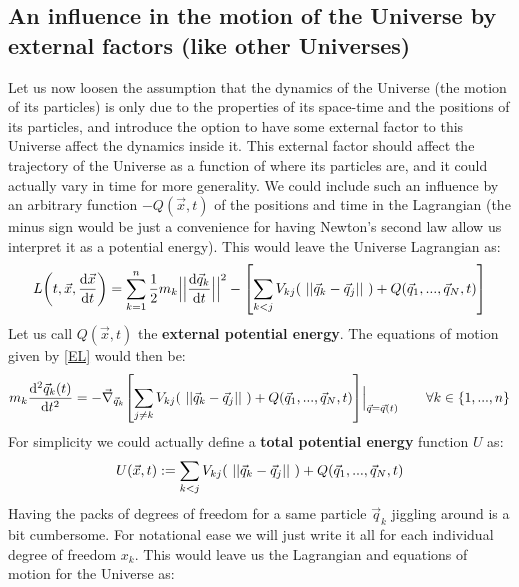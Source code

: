 \documentclass[11pt, a4paper]{article} %
\begin{document}
\vspace{-0.3cm}
\subsection*{An influence in the motion of the Universe by external factors (like other Universes)}
Let us now loosen the assumption that the dynamics of the Universe (the motion of its particles) is only due to the properties of its space-time and the positions of its particles, and introduce the option to have some external factor to this Universe affect the dynamics inside it. This external factor should affect the trajectory of the Universe as a function of where its particles are, and it could actually vary in time for more generality. We could include such an influence by an arbitrary function $-Q(\vec{x},t)$ of the positions and time in the Lagrangian (the minus sign would be just a convenience for having Newton's second law allow us interpret it as a potential energy). This would leave the Universe Lagrangian as:
\begin{equation}\label{genLag}
L\qty(t, \vec{x}, \dv{\vec{x}}{t})=\sum_{k=1}^n\frac{1}{2} m_k\Big|\Big|\dv{\vec{q}_k}{t}\Big|\Big|^2-\qty[\sum_{k<j} V_{kj}(\ ||\vec{q}_k-\vec{q}_j||\ )+Q(\vec{q}_1,...,\vec{q}_N,t)]
\end{equation}
Let us call $Q(\vec{x},t)$ the {\bf external potential energy}. The equations of motion given by \eqref{EL} would then be:\vspace{-0.15cm}
\begin{equation}\label{NewtOneUn}
m_k \dv[2]{\vec{q}_k(t)}{t} = -\vec{\nabla}_{\vec{q}_k}\qty[\sum_{j\neq k} V_{kj}\qty(\ ||\vec{q}_k-\vec{q}_j||\ )+ Q(\vec{q}_1,...,\vec{q}_N,t)]\Big\rvert_{\vec{q}=\vec{q}(t)}\quad\quad \forall k\in\{1,...,n\}
\end{equation}
For simplicity we could actually define a {\bf total potential energy} function $U$ as:
\begin{equation}
U(\vec{x},t):=\sum_{k<j} V_{kj}(\ ||\vec{q}_k-\vec{q}_j||\ )+Q(\vec{q}_1,...,\vec{q}_N,t)\vspace{-0.15cm}
\end{equation}
Having the packs of degrees of freedom for a same particle $\vec{q}_k$ jiggling around is a bit cumbersome. For notational ease we will just write it all for each individual degree of freedom $x_k$. This would leave us the Lagrangian and equations of motion for the Universe as:
\end{document}
